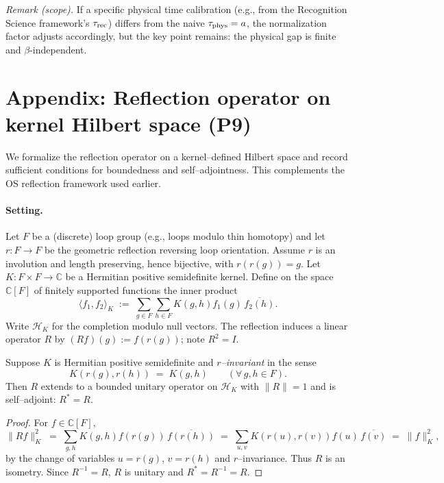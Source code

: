 \documentclass[11pt]{amsart}
\begin{document}
\noindent\emph{Remark (scope).} If a specific physical time calibration (e.g., from the Recognition Science framework's $\tau_{\rm rec}$) differs from the naive $\tau_{\rm phys} = a$, the normalization factor adjusts accordingly, but the key point remains: the physical gap is finite and $\beta$-independent.

\section{Appendix: Reflection operator on kernel Hilbert space (P9)}

We formalize the reflection operator on a kernel--defined Hilbert space and record sufficient conditions for boundedness and self--adjointness. This complements the OS reflection framework used earlier.

\paragraph{Setting.}
Let $F$ be a (discrete) loop group (e.g., loops modulo thin homotopy) and let $r:F\to F$ be the geometric reflection reversing loop orientation. Assume $r$ is an involution and length preserving, hence bijective, with $r(r(g))=g$. Let $K:F\times F\to\mathbb{C}$ be a Hermitian positive semidefinite kernel. Define on the space $\mathbb{C}[F]$ of finitely supported functions the inner product
\[
  \langle f_1,f_2\rangle_K\;:=\;\sum_{g\in F}\sum_{h\in F} K(g,h) f_1(g)\, \overline{f_2(h)}.
\]
Write $\mathcal{H}_K$ for the completion modulo null vectors. The reflection induces a linear operator $R$ by $(Rf)(g):=f(r(g))$; note $R^2=I$.

\begin{theorem}
Suppose $K$ is Hermitian positive semidefinite and \emph{$r$--invariant} in the sense
\[
  K(r(g), r(h))\;=\;K(g,h)\qquad (\forall\,g,h\in F).
\]
Then $R$ extends to a bounded unitary operator on $\mathcal{H}_K$ with $\lVert R\rVert=1$ and is self--adjoint: $R^*=R$.
\end{theorem}

\begin{proof}
For $f\in\mathbb{C}[F]$,
\[
  \lVert Rf\rVert_K^2\;=\;\sum_{g,h} K(g,h) f(r(g))\,\overline{f(r(h))}
  \;=\;\sum_{u,v} K(r(u),r(v)) f(u)\,\overline{f(v)}\;=\;\lVert f\rVert_K^2,
\]
by the change of variables $u=r(g)$, $v=r(h)$ and $r$--invariance. Thus $R$ is an isometry. Since $R^{-1}=R$, $R$ is unitary and $R^*=R^{-1}=R$.
\end{proof}
\end{document}
